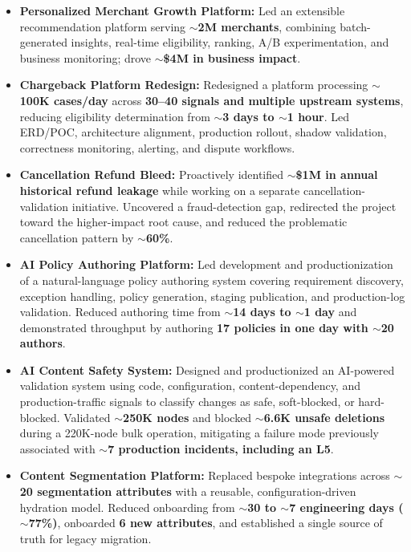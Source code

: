 \documentclass[10pt,a4paper]{article}
\begin{document}
\begin{itemize}

    \item
    \textbf{Personalized Merchant Growth Platform:}
    Led an extensible recommendation platform serving
    \textbf{$\sim$2M merchants}, combining batch-generated insights,
    real-time eligibility, ranking, A/B experimentation, and business
    monitoring; drove \textbf{$\sim$\$4M in business impact}.

    \item
    \textbf{Chargeback Platform Redesign:}
    Redesigned a platform processing \textbf{$\sim$100K cases/day} across
    \textbf{30--40 signals and multiple upstream systems}, reducing eligibility
    determination from \textbf{$\sim$3 days to $\sim$1 hour}.
    Led ERD/POC, architecture alignment, production rollout, shadow validation,
    correctness monitoring, alerting, and dispute workflows.

    \item
    \textbf{Cancellation Refund Bleed:}
    Proactively identified \textbf{$\sim$\$1M in annual historical refund leakage}
    while working on a separate cancellation-validation initiative.
    Uncovered a fraud-detection gap, redirected the project toward the
    higher-impact root cause, and reduced the problematic cancellation pattern
    by \textbf{$\sim$60\%}.

    \item
    \textbf{AI Policy Authoring Platform:}
    Led development and productionization of a natural-language policy
    authoring system covering requirement discovery, exception handling,
    policy generation, staging publication, and production-log validation.
    Reduced authoring time from \textbf{$\sim$14 days to $\sim$1 day} and
    demonstrated throughput by authoring
    \textbf{17 policies in one day with $\sim$20 authors}.

    \item
    \textbf{AI Content Safety System:}
    Designed and productionized an AI-powered validation system using code,
    configuration, content-dependency, and production-traffic signals to
    classify changes as safe, soft-blocked, or hard-blocked.
    Validated \textbf{$\sim$250K nodes} and blocked
    \textbf{$\sim$6.6K unsafe deletions} during a 220K-node bulk operation,
    mitigating a failure mode previously associated with
    \textbf{$\sim$7 production incidents, including an L5}.

    \item
    \textbf{Content Segmentation Platform:}
    Replaced bespoke integrations across
    \textbf{$\sim$20 segmentation attributes} with a reusable,
    configuration-driven hydration model.
    Reduced onboarding from
    \textbf{$\sim$30 to $\sim$7 engineering days ($\sim$77\%)},
    onboarded \textbf{6 new attributes}, and established a single source of
    truth for legacy migration.


\end{itemize}
\end{document}
